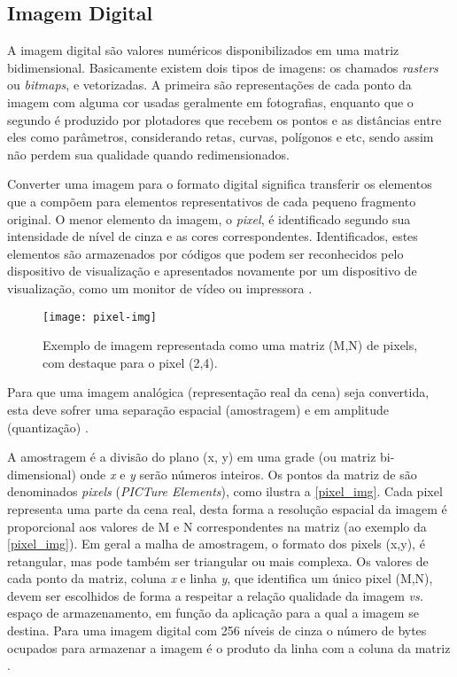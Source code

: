 \subsection{Imagem Digital}\label{subsec:imagem}

A imagem digital são valores numéricos disponibilizados em uma matriz bidimensional. Basicamente existem dois tipos de imagens: os chamados \textit{rasters} ou \textit{bitmaps}, e vetorizadas. A primeira são representações de cada ponto da imagem com alguma cor usadas geralmente em fotografias, enquanto que o segundo é produzido por plotadores que recebem os pontos e as distâncias entre eles como parâmetros, considerando retas, curvas, polígonos e etc, sendo assim não perdem sua qualidade quando redimensionados.

Converter uma imagem para o formato digital significa transferir os elementos que a compõem para elementos representativos de cada pequeno fragmento original. O menor elemento da imagem, o \textit{pixel}, é identificado segundo sua intensidade de nível de cinza e as cores correspondentes. Identificados, estes elementos são armazenados por códigos que podem ser reconhecidos pelo dispositivo de visualização e apresentados novamente por um dispositivo de visualização, como um monitor de vídeo ou impressora \cite{img-digital-willians}. 

\begin{figure}[h]
	\centering
	\texttt{[image: pixel-img]}
	\caption{Exemplo de imagem representada como uma matriz (M,N) de pixels, com destaque para o pixel (2,4).}
	\label{pixel_img}
\end{figure}


Para que uma imagem analógica (representação real da cena) seja convertida, esta deve sofrer uma separação espacial (amostragem) e em amplitude (quantização) \cite{img-digital-willians}. 

A amostragem é a divisão do plano (x, y) em uma grade (ou matriz bi-dimensional) onde \textit{x} e \textit{y} serão números inteiros. Os pontos da matriz de são denominados \textit{pixels} (\textit{PICTure Elements}), como ilustra a \autoref{pixel_img}. Cada pixel representa uma parte da cena real, desta forma a resolução espacial da imagem é proporcional aos valores de M e N correspondentes na matriz (ao exemplo da \autoref{pixel_img}). Em geral a malha de amostragem, o formato dos pixels (x,y), é retangular, mas pode também ser triangular ou mais complexa. Os valores de cada ponto da matriz, coluna \textit{x} e linha \textit{y}, que identifica um único pixel (M,N), devem ser escolhidos de forma a respeitar a relação qualidade da imagem \textit{vs.} espaço de armazenamento, em função da aplicação para a qual a imagem se destina. Para uma imagem digital com 256 níveis de cinza o número de bytes ocupados para armazenar a imagem é o produto da linha com a coluna da matriz \cite{img-digital-willians}. 


